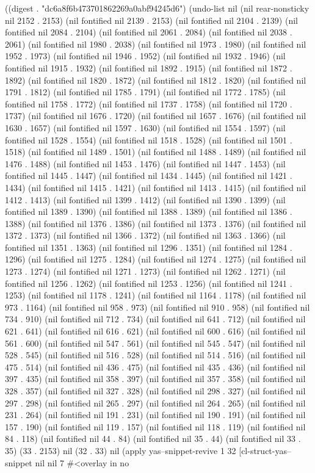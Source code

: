 
((digest . "dc6a8f6b473701862269a0abf94245d6") (undo-list nil (nil rear-nonsticky nil 2152 . 2153) (nil fontified nil 2139 . 2153) (nil fontified nil 2104 . 2139) (nil fontified nil 2084 . 2104) (nil fontified nil 2061 . 2084) (nil fontified nil 2038 . 2061) (nil fontified nil 1980 . 2038) (nil fontified nil 1973 . 1980) (nil fontified nil 1952 . 1973) (nil fontified nil 1946 . 1952) (nil fontified nil 1932 . 1946) (nil fontified nil 1915 . 1932) (nil fontified nil 1892 . 1915) (nil fontified nil 1872 . 1892) (nil fontified nil 1820 . 1872) (nil fontified nil 1812 . 1820) (nil fontified nil 1791 . 1812) (nil fontified nil 1785 . 1791) (nil fontified nil 1772 . 1785) (nil fontified nil 1758 . 1772) (nil fontified nil 1737 . 1758) (nil fontified nil 1720 . 1737) (nil fontified nil 1676 . 1720) (nil fontified nil 1657 . 1676) (nil fontified nil 1630 . 1657) (nil fontified nil 1597 . 1630) (nil fontified nil 1554 . 1597) (nil fontified nil 1528 . 1554) (nil fontified nil 1518 . 1528) (nil fontified nil 1501 . 1518) (nil fontified nil 1489 . 1501) (nil fontified nil 1488 . 1489) (nil fontified nil 1476 . 1488) (nil fontified nil 1453 . 1476) (nil fontified nil 1447 . 1453) (nil fontified nil 1445 . 1447) (nil fontified nil 1434 . 1445) (nil fontified nil 1421 . 1434) (nil fontified nil 1415 . 1421) (nil fontified nil 1413 . 1415) (nil fontified nil 1412 . 1413) (nil fontified nil 1399 . 1412) (nil fontified nil 1390 . 1399) (nil fontified nil 1389 . 1390) (nil fontified nil 1388 . 1389) (nil fontified nil 1386 . 1388) (nil fontified nil 1376 . 1386) (nil fontified nil 1373 . 1376) (nil fontified nil 1372 . 1373) (nil fontified nil 1366 . 1372) (nil fontified nil 1363 . 1366) (nil fontified nil 1351 . 1363) (nil fontified nil 1296 . 1351) (nil fontified nil 1284 . 1296) (nil fontified nil 1275 . 1284) (nil fontified nil 1274 . 1275) (nil fontified nil 1273 . 1274) (nil fontified nil 1271 . 1273) (nil fontified nil 1262 . 1271) (nil fontified nil 1256 . 1262) (nil fontified nil 1253 . 1256) (nil fontified nil 1241 . 1253) (nil fontified nil 1178 . 1241) (nil fontified nil 1164 . 1178) (nil fontified nil 973 . 1164) (nil fontified nil 958 . 973) (nil fontified nil 910 . 958) (nil fontified nil 734 . 910) (nil fontified nil 712 . 734) (nil fontified nil 641 . 712) (nil fontified nil 621 . 641) (nil fontified nil 616 . 621) (nil fontified nil 600 . 616) (nil fontified nil 561 . 600) (nil fontified nil 547 . 561) (nil fontified nil 545 . 547) (nil fontified nil 528 . 545) (nil fontified nil 516 . 528) (nil fontified nil 514 . 516) (nil fontified nil 475 . 514) (nil fontified nil 436 . 475) (nil fontified nil 435 . 436) (nil fontified nil 397 . 435) (nil fontified nil 358 . 397) (nil fontified nil 357 . 358) (nil fontified nil 328 . 357) (nil fontified nil 327 . 328) (nil fontified nil 298 . 327) (nil fontified nil 297 . 298) (nil fontified nil 265 . 297) (nil fontified nil 264 . 265) (nil fontified nil 231 . 264) (nil fontified nil 191 . 231) (nil fontified nil 190 . 191) (nil fontified nil 157 . 190) (nil fontified nil 119 . 157) (nil fontified nil 118 . 119) (nil fontified nil 84 . 118) (nil fontified nil 44 . 84) (nil fontified nil 35 . 44) (nil fontified nil 33 . 35) (33 . 2153) nil (32 . 33) nil (apply yas--snippet-revive 1 32 [cl-struct-yas--snippet nil nil 7 #<overlay in no 